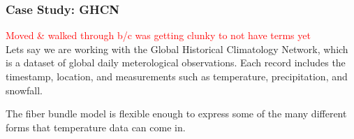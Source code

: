 
\subsubsection{Case Study: GHCN}
\textcolor{red}{Moved \& walked through b/c was getting clunky to not have terms yet}\\

Lets say we are working with the Global Historical Climatology Network\cite{AnOverviewoftheGlobalHistoricalClimatologyNetworkDailyDatabase}, which is a dataset of global daily meterological observations. Each record includes the timestamp, location, and measurements such as temperature, precipitation, and snowfall.

The fiber bundle model is flexible enough to express some of the many different forms that temperature data can come in. 

